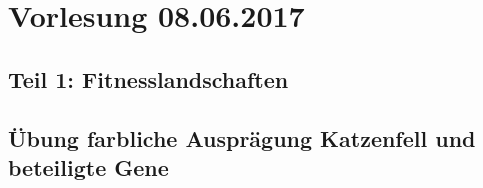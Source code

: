 \section{Vorlesung 08.06.2017}

\subsection{Teil 1: Fitnesslandschaften}

\subsection{Übung farbliche Ausprägung Katzenfell und beteiligte Gene}